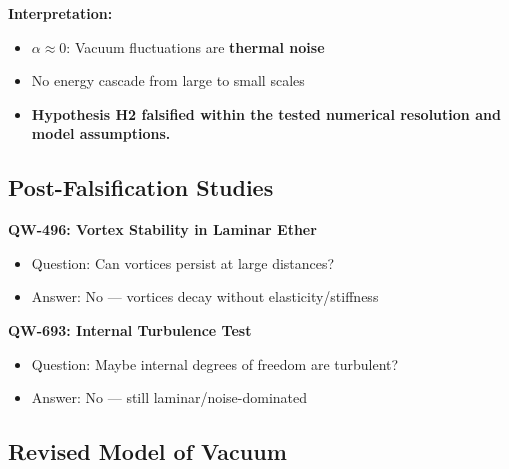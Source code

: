 \documentclass[11pt,a4paper]{book}
\theoremstyle{remark}
\begin{document}
\textbf{Interpretation:}
\begin{itemize}
    \item $\alpha \approx 0$: Vacuum fluctuations are \textbf{thermal noise}
    \item No energy cascade from large to small scales
    \item \textbf{Hypothesis H2 falsified within the tested numerical resolution and model assumptions.}
\end{itemize}

\subsection{Post-Falsification Studies}

\textbf{QW-496: Vortex Stability in Laminar Ether}
\begin{itemize}
    \item Question: Can vortices persist at large distances?
    \item Answer: No --- vortices decay without elasticity/stiffness
\end{itemize}

\textbf{QW-693: Internal Turbulence Test}
\begin{itemize}
    \item Question: Maybe internal degrees of freedom are turbulent?
    \item Answer: No --- still laminar/noise-dominated
\end{itemize}

\subsection{Revised Model of Vacuum}

\begin{center}
\end{center}
\end{document}
